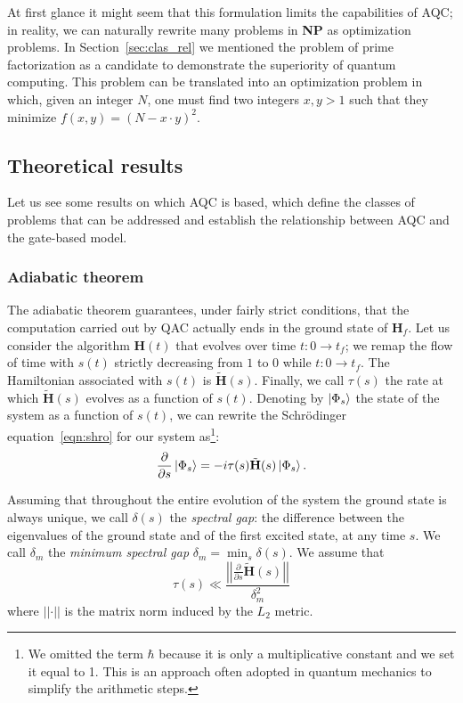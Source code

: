 At first glance it might seem that this formulation limits the capabilities of AQC; in reality, we can naturally rewrite many problems in \textbf{NP} as optimization problems. In Section~\ref{sec:clas_rel} we mentioned the problem of prime factorization as a candidate to demonstrate the superiority of quantum computing. This problem can be translated into an optimization problem in which, given an integer $N$, one must find two integers $x, y > 1$ such that they minimize $f(x,y) = (N - x\cdot y)^2$.
\subsection{Theoretical results}
Let us see some results on which AQC is based, which define the classes of problems that can be addressed and establish the relationship between AQC and the gate-based model.
\subsubsection*{Adiabatic theorem}
The adiabatic theorem guarantees, under fairly strict conditions, that the computation carried out by QAC actually ends in the ground state of $\mathbf{H}_f$. Let us consider the algorithm $\mathbf{H}(t)$ that evolves over time $t:0 \rightarrow t_f$; we remap the flow of time with $s(t)$ strictly decreasing from $1$ to $0$ while $t:0 \rightarrow t_f$. The Hamiltonian associated with $s(t)$ is $\tilde{\mathbf{H}}(s)$. Finally, we call $\tau(s)$ the rate at which $\tilde{\mathbf{H}}(s)$ evolves as a function of $s(t)$. Denoting by $\Ket{\Phi_s}$ the state of the system as a function of $s(t)$, we can rewrite the Schrödinger equation~\ref{eqn:shro} for our system as\footnote{We omitted the term $\hbar$ because it is only a multiplicative constant and we set it equal to 1. This is an approach often adopted in quantum mechanics to simplify the arithmetic steps.}:
\[
\frac{\partial}{\partial s} \Ket{\Phi_s} =  -i \tau(s)\tilde{\mathbf{H}}(s)\Ket{\Phi_s}.
\]

Assuming that throughout the entire evolution of the system the ground state is always unique, we call $\delta(s)$ the \emph{spectral gap}: the difference between the eigenvalues of the ground state and of the first excited state, at any time $s$. We call $\delta_m$ the \emph{minimum spectral gap} $\delta_m = \min_s \delta(s)$. We assume that
\begin{equation}
	\label{eqn:bound_tau}
	\tau(s) \ll \frac{\left|\left|\frac{\partial}{\partial s} \tilde{\mathbf{H}}(s)\right|\right|}{\delta_m ^2}
\end{equation}
where $\left|\left|\cdot\right|\right|$ is the matrix norm induced by the $L_2$ metric.


